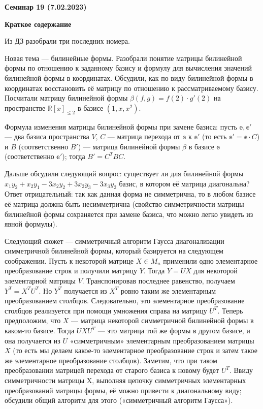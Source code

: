 \documentclass[10pt, a4paper]{extarticle}
\def \R{\mathbb{R}}
\theoremstyle{definition}
\begin{document}
\begin{center}
\small
\noindent{}
\end{center}

\large

\begin{center}
\textbf{Семинар 19 (7.02.2023)}
\end{center}

\textbf{Краткое содержание}

Из ДЗ разобрали три последних номера.

Новая тема --- билинейные формы.
Разобрали понятие матрицы билинейной формы по отношению к заданному базису и формулу для вычисления значений билинейной формы в координатах.
Обсудили, как по виду билинейной формы в координатах восстановить её матрицу по отношению к рассматриваемому базису.
Посчитали матрицу билинейной формы $\beta(f,g) = f(2)\cdot g'(2)$ на пространстве $\R[x]_{\leqslant 2}$ в базисе $(1,x, x^2)$.

Формула изменения матрицы билинейной формы при замене базиса: пусть $\mathbb e, \mathbb e'$ --- два базиса пространства $V$, $C$ --- матрица перехода от $\mathbb e$ к $\mathbb e'$ (то есть $\mathbb e' = \mathbb e \cdot C$) и $B$ (соответственно $B'$) --- матрица билинейной формы $\beta$ в базисе $\mathbb e$ (соответственно $\mathbb e'$); тогда $B' = C^TBC$.

Дальше обсудили следующий вопрос: существует ли для билинейной формы $x_1y_2 + x_2y_1 - 3x_2y_2 +3x_2y_3 - 3x_3y_2$ базис, в котором её матрица диагональна?
Ответ отрицательный: так как данная форма не симметрична, то в любом базисе её матрица должна быть несимметрична (свойство симметричности матрицы билинейной формы сохраняется при замене базиса, что можно легко увидеть из явной формулы).

Следующий сюжет --- симметричный алгоритм Гаусса диагонализации симметричной билинейной формы, который базируется на следующем соображении. 
Пусть к некоторой матрице $X \in M_n$ применили одно элементарное преобразование строк и получили матрицу $Y$. Тогда $Y = UX$ для некоторой
элементарной матрицы $V$. Транспонировав последнее равенство, получаем $Y^T = X^TU^T$. Но $Y^T$ получается из $X^T$ ровно таким же элементарным 
преобразованием столбцов. Следовательно, это элементарное преобразование столбцов реализуется при помощи умножения справа на матрицу $U^T$. 
Теперь предположим, что $X$ — матрица некоторой симметричной билинейной формы в каком-то базисе. Тогда $UXU^T$ — это матрица той же формы в 
другом базисе, и она получается из $U$ «симметричным» элементарным преобразованием матрицы $X$ (то есть мы делаем какое-то элементарное 
преобразование строк и затем такое же элементарное преобразование столбцов). Заметим, что при таком преобразовании матрицей перехода от 
старого базиса к новому будет $U^T$. Ввиду симметричности матрицы X, выполняя цепочку симметричных элементарных преобразований матрицы формы, 
её можно привести к диагональному виду; обсудили общий алгоритм для этого («симметричный алгоритм Гаусса»).
\end{document}
